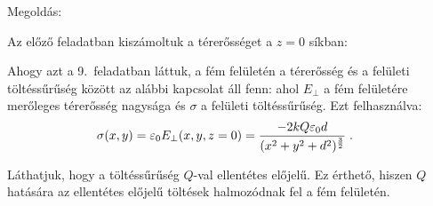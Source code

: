 
\ifdefined\megoldas

 Megoldás: 

 Az előző feladatban kiszámoltuk a térerősséget a $z=0$ síkban:

 Ahogy azt a 9.\ feladatban láttuk, a fém felületén a térerősség és a felületi töltéssűrűség között az alábbi kapcsolat áll fenn:
 ahol $E_\perp$ a fém felületére merőleges térerősség nagysága és $\sigma$ a felületi töltéssűrűség. Ezt felhasználva:
 \begin{align}
  \sigma(x,y) &= \varepsilon_0E_\perp(x,y,z=0) = \frac{-2kQ\varepsilon_0 d}{(x^2+y^2+d^2)^\frac{3}{2}}\;.
 \end{align}


 Láthatjuk, hogy a töltéssűrűség $Q$-val ellentétes előjelű. Ez érthető, hiszen $Q$ hatására az ellentétes előjelű töltések halmozódnak fel a fém felületén. 

\fi